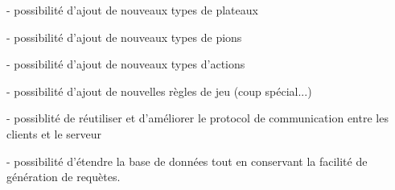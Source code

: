 \documentclass[french,12pt]{report}
\begin{document}
 - possibilit\'e d'ajout de nouveaux types de plateaux


 - possibilit\'e d'ajout de nouveaux types de pions


 - possibilit\'e d'ajout de nouveaux types d'actions


 - possibilit\'e d'ajout de nouvelles r\`egles de jeu (coup sp\'ecial...)


 - possiblit\'e de r\'eutiliser et d'am\'eliorer le protocol de communication entre les clients et le serveur


 - possibilit\'e d'\'etendre la base de donn\'ees tout en conservant la facilit\'e de g\'en\'eration de requ\`etes.
\end{document}
